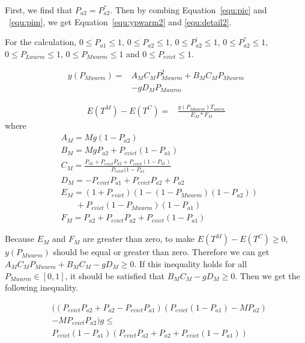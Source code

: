 First, we find that $P_{a2} = P_{a2}^{''}$.
Then by combing Equation~\ref{equ:pic} and ~\ref{equ:pim}, we get Equation~\ref{equ:ypwarm2} and \ref{equ:detail2}.

For the calculation, $0 \leq P_{a1} \leq 1$, $0 \leq P_{a2} \leq 1$, $0 \leq P_{a2}^{'} \leq 1$, $0 \leq P_{a2}^{''} \leq 1$, $0 \leq P_{Lwarm} \leq 1$, $0 \leq P_{Mwarm} \leq 1$
 and $0 \leq P_{evict} \leq 1$.

\begin{equation}
\label{equ:ypwarm2}
\begin{split}
y(P_{Mwarm}) = & A_{M}C_{M}P_{Mwarm}^2+B_{M}C_{M}P_{Mwarm} \\
&-gD_{M}P_{Mwarm} \,
\end{split}\end{equation}

\begin{equation}
\label{equ:detail2}
\begin{split}
E(T^{M}) - E(T^{C}) = &\frac{y(P_{Mwarm})T_{warm}}{E_{M}*F_{M}}
\end{split}\end{equation}
where
\begin{equation*}
\begin{split}
&A_{M}= Mg(1-P_{a2})\\
&B_{M}=MgP_{a2}+P_{evict}(1-P_{a1})\\
&C_{M}=\frac{P_{a2}+P_{evict}P_{a2}+P_{evict}(1-P_{a1})}{P_{evict}(1-P_{a1}}\\
&D_{M}=-P_{evict}P_{a1}+P_{evict}P_{a2}+P_{a2}\\
&E_{M}=(1+P_{evict})(1-(1-P_{Mwarm})(1-P_{a2})) \\& \ \ \ \ \ \ \ \ +P_{evict}(1-P_{Mwarm})(1-P_{a1})\\
&F_{M}=P_{a2}+P_{evict}P_{a2}+P_{evict}(1-P_{a1})
\end{split}\end{equation*}

Because $E_{M}$ and $F_{M}$ are greater than zero, to make $E(T^{M}) - E(T^{C}) \geq 0$, $y(P_{Mwarm})$ should be equal or greater than zero.
Therefore we can get $ A_{M}C_{M}P_{Mwarm}+B_{M}C_{M}-gD_{M} \geq 0$.
If this inequality holds for all $P_{Mwarm} \in [0,1]$, it should be satisfied that $B_{M}C_{M}-gD_{M} \geq 0$.
Then we get the following inequality.

\begin{equation}
\label{equ:gcondition}
\begin{split}
&((P_{evict}P_{a2}+P_{a2}-P_{evict}P_{a1})(P_{evict}(1-P_{a1})-MP_{a2}) \\
&-MP_{evict}P_{a2})g \leq \\
&P_{evict}(1-P_{a1})(P_{evict}P_{a2}+P_{a2}+P_{evict}(1-P_{a1}))
\end{split}\end{equation}

